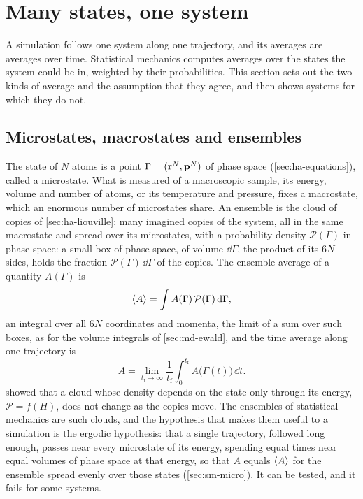 \section{Many states, one system}
\label{sec:sm-ergodic}

A simulation follows one system along one trajectory, and its averages
are averages over time. Statistical mechanics computes averages over the
states the system could be in, weighted by their probabilities. This
section sets out the two kinds of average and the assumption that they
agree, and then shows systems for which they do not.

\subsection*{Microstates, macrostates and ensembles}

The state of $N$ atoms is a point $\Gamma = (\bm{\mathrm{r}}^N, \bm{\mathrm{p}}^N)$ of phase
space (\cref{sec:ha-equations}), called a microstate. What is measured of
a macroscopic sample, its energy, volume and number of atoms, or its
temperature and pressure, fixes a macrostate, which an enormous number of
microstates share. An ensemble is the cloud of copies of \cref{sec:ha-liouville}:
many imagined copies of the system, all in the same macrostate and spread
over its microstates, with a probability density $\mathcal{P}(\Gamma)$ in phase
space: a small box of phase space, of volume $\dd\Gamma$, the product of
its $6N$ sides, holds the fraction $\mathcal{P}(\Gamma)\,\dd\Gamma$ of the
copies. The ensemble average of a quantity $A(\Gamma)$ is
\begin{equation*}
   \langle A \rangle = \int A(\Gamma)\,\mathcal{P}(\Gamma)\,\mathrm{d}\Gamma ,
\end{equation*}
an integral over all $6N$ coordinates and momenta, the limit of a sum
over such boxes, as for the volume integrals of \cref{sec:md-ewald}, and
the time average
along one trajectory is
\begin{equation*}
   \overline{A} = \lim_{t_{\mathrm f}\to\infty}\frac{1}{t_{\mathrm f}}
   \int_0^{t_{\mathrm f}}A\bigl(\Gamma(t)\bigr)\,\dd t .
\end{equation*}
 showed that a cloud whose density depends on the
state only through its energy, $\mathcal{P} = f(H)$, does not change as the
copies move. The ensembles of statistical mechanics are such clouds, and
the hypothesis that makes them useful to a simulation is the ergodic
hypothesis: that a single trajectory, followed long enough, passes near
every microstate of its energy, spending equal times near equal volumes of
phase space at that energy, so that $\overline{A}$ equals $\langle A \rangle$ for
the ensemble spread evenly over those states (\cref{sec:sm-micro}). It can be tested, and it fails for some systems.

